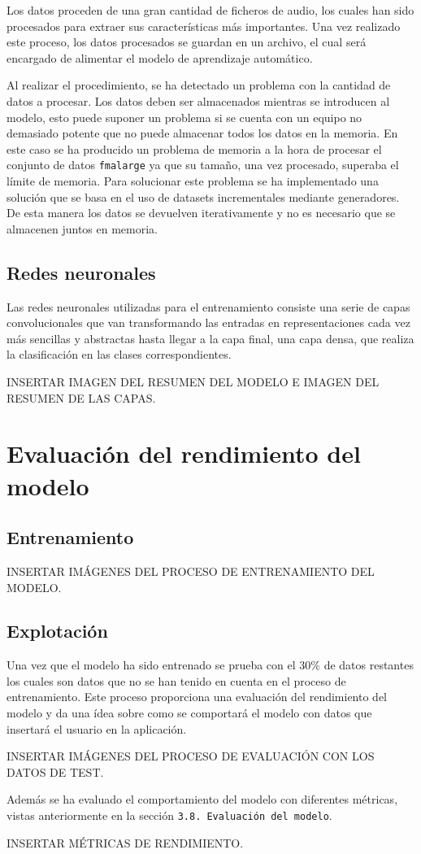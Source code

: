 Los datos proceden de una gran cantidad de ficheros de audio, los cuales han sido procesados para extraer sus características más importantes. Una vez realizado este proceso, los datos procesados se guardan en un archivo, el cual será encargado de alimentar el modelo de aprendizaje automático.

Al realizar el procedimiento, se ha detectado un problema con la cantidad de datos a procesar. Los datos deben ser almacenados mientras se introducen al modelo, esto puede suponer un problema si se cuenta con un equipo no demasiado potente que no puede almacenar todos los datos en la memoria. 
En este caso se ha producido un problema de memoria a la hora de procesar el conjunto de datos \texttt{fma\textunderscore large} ya que su tamaño, una vez procesado, superaba el límite de memoria. Para solucionar este problema se ha implementado una solución que se basa en el uso de datasets incrementales mediante generadores. De esta manera los datos se devuelven iterativamente y no es necesario que se almacenen juntos en memoria.

\subsection{Redes neuronales}

Las redes neuronales utilizadas para el entrenamiento consiste una serie de capas convolucionales que van transformando las entradas en representaciones cada vez más sencillas y abstractas hasta llegar a la capa final, una capa densa, que realiza la clasificación en las clases correspondientes.

INSERTAR IMAGEN DEL RESUMEN DEL MODELO E IMAGEN DEL RESUMEN DE LAS CAPAS.

\section{Evaluación del rendimiento del modelo}

\subsection{Entrenamiento}

INSERTAR IMÁGENES DEL PROCESO DE ENTRENAMIENTO DEL MODELO.

\subsection{Explotación}

Una vez que el modelo ha sido entrenado se prueba con el 30\% de datos restantes los cuales son datos que no se han tenido en cuenta en el proceso de entrenamiento. Este proceso proporciona una evaluación del rendimiento del modelo y da una ídea sobre como se comportará el modelo con datos que insertará el usuario en la aplicación.

INSERTAR IMÁGENES DEL PROCESO DE EVALUACIÓN CON LOS DATOS DE TEST.

Además se ha evaluado el comportamiento del modelo con diferentes métricas, vistas anteriormente en la sección \texttt{3.8. Evaluación del modelo}.

INSERTAR MÉTRICAS DE RENDIMIENTO.